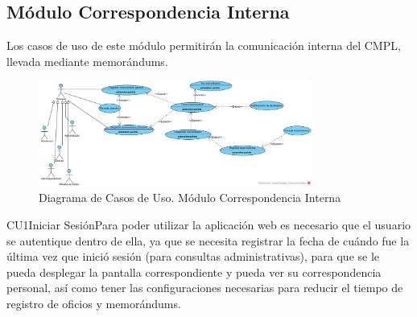 	\subsection{Módulo Correspondencia Interna}
	Los casos de uso de este módulo permitirán la comunicación interna del CMPL, llevada mediante memorándums. 
	
	\begin{figure}[htbp!]
		\centering
			\includegraphics[width=0.8\textwidth]{images/Trabajo/CorrespondenciaInterna}
		\caption{Diagrama de Casos de Uso. Módulo Correspondencia Interna}
		\label{diagrama de cu}
	\end{figure}
	\begin{UseCase}{CU1}{Iniciar Sesión}{Para poder utilizar la aplicación web es necesario que el usuario se autentique dentro de ella, ya que se necesita registrar la fecha de cuándo fue la última vez que inició sesión (para consultas administrativas), para que se le pueda desplegar la pantalla correspondiente y pueda ver su correspondencia personal, así como tener las configuraciones necesarias para reducir el tiempo de registro de oficios y memorándums.}
	\end{UseCase}

